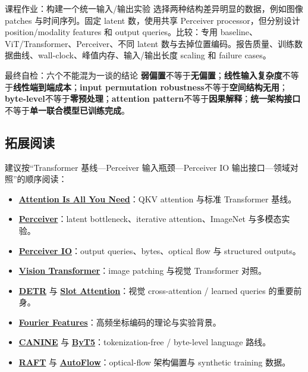 \documentclass[a4paper]{article}
\begin{document}
\begin{importantbox}{课程作业：构建一个统一输入/输出实验}
选择两种结构差异明显的数据，例如图像 patches 与时间序列。固定 latent 数，使用共享 Perceiver processor，但分别设计 position/modality features 和 output queries。比较：专用 baseline、ViT/Transformer、Perceiver、不同 latent 数与去掉位置编码。报告质量、训练数据曲线、wall-clock、峰值内存、输入/输出长度 scaling 和 failure cases。
\end{importantbox}

\begin{warningbox}{最终自检：六个不能混为一谈的结论}
\textbf{弱偏置}不等于\textbf{无偏置}；\textbf{线性输入复杂度}不等于\textbf{线性端到端成本}；\textbf{input permutation robustness}不等于\textbf{空间结构无用}；\textbf{byte-level}不等于\textbf{零预处理}；\textbf{attention pattern}不等于\textbf{因果解释}；\textbf{统一架构接口}不等于\textbf{单一联合模型已训练完成}。
\end{warningbox}

\subsection{拓展阅读}

建议按“Transformer 基线—Perceiver 输入瓶颈—Perceiver IO 输出接口—领域对照”的顺序阅读：

{\small
\begin{itemize}[nosep,leftmargin=*]
  \item \href{https://arxiv.org/abs/1706.03762}{\textbf{Attention Is All You Need}}：QKV attention 与标准 Transformer 基线。
  \item \href{https://arxiv.org/abs/2103.03206}{\textbf{Perceiver}}：latent bottleneck、iterative attention、ImageNet 与多模态实验。
  \item \href{https://arxiv.org/abs/2107.14795}{\textbf{Perceiver IO}}：output queries、bytes、optical flow 与 structured outputs。
  \item \href{https://arxiv.org/abs/2010.11929}{\textbf{Vision Transformer}}：image patching 与视觉 Transformer 对照。
  \item \href{https://arxiv.org/abs/2005.12872}{\textbf{DETR}} 与 \href{https://arxiv.org/abs/2006.15055}{\textbf{Slot Attention}}：视觉 cross-attention / learned queries 的重要前身。
  \item \href{https://arxiv.org/abs/2006.10739}{\textbf{Fourier Features}}：高频坐标编码的理论与实验背景。
  \item \href{https://arxiv.org/abs/2103.06874}{\textbf{CANINE}} 与 \href{https://arxiv.org/abs/2105.13626}{\textbf{ByT5}}：tokenization-free / byte-level language 路线。
  \item \href{https://arxiv.org/abs/2003.12039}{\textbf{RAFT}} 与 \href{https://arxiv.org/abs/2104.14544}{\textbf{AutoFlow}}：optical-flow 架构偏置与 synthetic training 数据。
\end{itemize}
}
\end{document}
